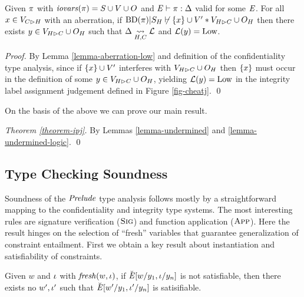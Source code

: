 \begin{lemma}
  \label{lemma-undermined}
  Given $\pi$ with $\mathit{iovars}(\pi) = S \cup V \cup O$ and
  $\mathit{E} \vdash \pi : \Delta$ valid for some $\mathit{E}$.  For all $x \in
  V_{C \rhd H}$ with an aberration, if
  $\mathrm{BD}(\pi)|S_H \not\vdash \{ x \} \cup V' * V_{H \rhd C} \cup O_H$
  then there exists $y \in V_{H \rhd C} \cup O_H$ such that
  $\Delta \underset{H,C}{\leadsto} \mathcal{L}$ and $\mathcal{L}(y) = \mathrm{Low}$.
\end{lemma}
\begin{proof}
  By Lemma \ref{lemma-aberration-low} and definition of the
  confidentiality type analysis, since if $\{ x \} \cup V'$
  interferes with $V_{H \rhd C} \cup O_H$ then $\{ x \}$
  must occur in the definition of some $y \in V_{H \rhd C} \cup O_H$,
  yielding $\mathcal{L}(y) = \mathrm{Low}$ in the integrity label assignment
  judgement defined in Figure \ref{fig-cheatj}. \qed
\end{proof}
On the basis of the above we can prove our main result. 
\begin{proof}[Theorem \ref{theorem-ipj}]
  By Lemmas \ref{lemma-undermined} and \ref{lemma-undermined-logic}. \qed
\end{proof}

\subsection{Type Checking Soundness}

Soundness of the $\mathit{Prelude}$ type analysis follows mostly by a
straightforward mapping to the confidentiality and integrity type
systems. The most interesting rules are signature verification
($\text{\sc Sig}$) and function application ($\text{\sc App}$). 
Here the result hinges on the selection of ``fresh'' variables
that guarantee generalization of constraint entailment.
First we obtain a key result about instantiation and
satisfiability of constraints. 
\begin{lemma}
  \label{lemma-fresh}
  Given $w$ and $\iota$ with $\mathit{fresh}(w,\iota)$, if $\breve{\mathit{E}}[w/y_1,\iota/y_n]$
  is not satisfiable, then there exists no $w',\iota'$ such that
  $\breve{\mathit{E}}[w'/y_1,\iota'/y_n]$ is satisifiable.
\end{lemma}

